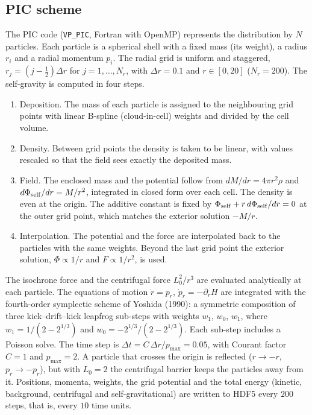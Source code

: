 \documentclass[11pt,a4paper]{article}
\begin{document}
\subsection{PIC scheme}
\label{sec:pic}

The PIC code (\texttt{VP\_PIC}, Fortran with OpenMP) represents the distribution by $N$
particles. Each particle is a spherical shell with a fixed mass (its weight), a radius
$r_i$ and a radial momentum $p_i$. The radial grid is uniform and staggered,
$r_j=(j-\tfrac12)\Delta r$ for $j=1,\dots,N_r$, with $\Delta r=0.1$ and $r\in[0,20]$
($N_r=200$). The self-gravity is computed in four steps.
\begin{enumerate}
\item Deposition. The mass of each particle is assigned to the neighbouring grid
points with linear B-spline (cloud-in-cell) weights and divided by the cell volume.
\item Density. Between grid points the density is taken to be linear, with values
rescaled so that the field sees exactly the deposited mass.
\item Field. The enclosed mass and the potential follow from $dM/dr=4\pi r^2\rho$ and
$d\Phi_{\rm self}/dr=M/r^2$, integrated in closed form over each cell. The density is
even at the origin. The additive constant is fixed by $\Phi_{\rm self}+r\,d\Phi_{\rm
self}/dr=0$ at the outer grid point, which matches the exterior solution $-M/r$.
\item Interpolation. The potential and the force are interpolated back to the
particles with the same weights. Beyond the last grid point the exterior solution,
$\Phi\propto1/r$ and $F\propto1/r^2$, is used.
\end{enumerate}
The isochrone force and the centrifugal force $L_0^2/r^3$ are evaluated analytically at
each particle. The equations of motion $\dot r=p_r$, $\dot p_r=-\partial_rH$ are
integrated with the fourth-order symplectic scheme of Yoshida (1990): a symmetric
composition of three kick--drift--kick leapfrog sub-steps with weights $w_1$, $w_0$,
$w_1$, where $w_1=1/(2-2^{1/3})$ and $w_0=-2^{1/3}/(2-2^{1/3})$. Each sub-step includes
a Poisson solve. The time step is $\Delta t=C\,\Delta r/p_{\max}=0.05$, with Courant
factor $C=1$ and $p_{\max}=2$. A particle that crosses the origin is reflected
($r\to-r$, $p_r\to-p_r$), but with $L_0=2$ the centrifugal barrier keeps the particles
away from it. Positions, momenta, weights, the grid potential and the total energy
(kinetic, background, centrifugal and self-gravitational) are written to HDF5 every
$200$ steps, that is, every $10$ time units.
\end{document}
